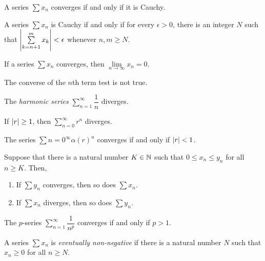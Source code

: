 \documentclass{article}
\begin{document}
\begin{theorem}
  A series $\sum x_n$ converges if and only if it is Cauchy.
\end{theorem}

\begin{theorem}
  A series $\sum x_n$ is Cauchy if and only if for every $\epsilon > 0$, there is an integer $N$ such that $\abs{\sum\limits_{k = n + 1}^m x_k} < \epsilon$ whenever $n, m \geq N$.
\end{theorem}

\begin{theorem}
  If a series $\sum x_n$ converges, then $\lim\limits_{n \to \infty} x_n = 0$.
\end{theorem}

The converse of the $n$th term test is not true.

\begin{theorem}
  The \emph{harmonic series} $\sum\limits_{n = 1}^\infty \dfrac{1}{n}$ diverges.
\end{theorem}

\begin{theorem}
  If $\abs{r} \geq 1$, then $\sum\limits_{n = 0}^\infty r^n$ diverges.
\end{theorem}

\begin{corollary}
  The series $\sum\limits{n = 0}^\infty \alpha(r)^n$ converges if and only if $\abs{r} < 1$.
\end{corollary}

\begin{theorem}
  Suppose that there is a natural number $K \in \mathbb{N}$ such that $0 \leq x_n \leq y_n$ for all $n \geq K$.
  Then,
  \begin{enumerate}
    \item If $\sum y_n$ converges, then so does $\sum x_n$.
    \item If $\sum x_n$ diverges, then so does $\sum y_n$.
  \end{enumerate}
\end{theorem}

\begin{theorem}
  The $p$-series $\sum\limits_{n = 1}^\infty \dfrac{1}{n^p}$ converges if and only if $p > 1$.
\end{theorem}

\begin{definition}
  A series $\sum x_n$ is \emph{eventually non-negative} if there is a natural number $N$ such that $x_n \geq 0$ for all $n \geq N$.
\end{definition}
\end{document}
